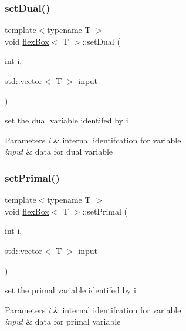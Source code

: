 \subsubsection{\texorpdfstring{set\+Dual()}{setDual()}}
{\footnotesize\ttfamily template$<$typename T $>$ \\
void \hyperlink{classflex_box}{flex\+Box}$<$ T $>$\+::set\+Dual (\begin{DoxyParamCaption}\item[{int}]{i,  }\item[{std\+::vector$<$ T $>$}]{input }\end{DoxyParamCaption})\hspace{0.3cm}{\ttfamily [inline]}}



set the dual variable identifed by i 


\begin{DoxyParams}{Parameters}
{\em i} & internal identifcation for variable \\
\hline
{\em input} & data for dual variable \\
\hline
\end{DoxyParams}
\mbox{\label{classflex_box_aacb08dc862943d6bb24353a62e2c9341}} 
\subsubsection{\texorpdfstring{set\+Primal()}{setPrimal()}}
{\footnotesize\ttfamily template$<$typename T $>$ \\
void \hyperlink{classflex_box}{flex\+Box}$<$ T $>$\+::set\+Primal (\begin{DoxyParamCaption}\item[{int}]{i,  }\item[{std\+::vector$<$ T $>$}]{input }\end{DoxyParamCaption})\hspace{0.3cm}{\ttfamily [inline]}}



set the primal variable identifed by i 


\begin{DoxyParams}{Parameters}
{\em i} & internal identifcation for variable \\
\hline
{\em input} & data for primal variable \\
\hline
\end{DoxyParams}


